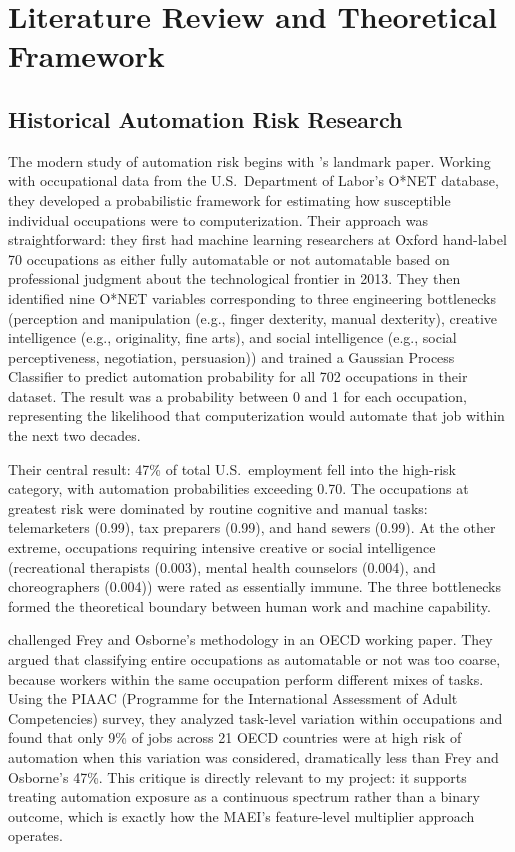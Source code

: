 
\chapter{Literature Review and Theoretical Framework}
\label{chap:literature}

\section{Historical Automation Risk Research}
\label{sec:historical-automation}

The modern study of automation risk begins with \citet{Frey_Osborne_2017}'s landmark paper. Working with occupational data from the U.S.\ Department of Labor's O*NET database, they developed a probabilistic framework for estimating how susceptible individual occupations were to computerization. Their approach was straightforward: they first had machine learning researchers at Oxford hand-label 70 occupations as either fully automatable or not automatable based on professional judgment about the technological frontier in 2013. They then identified nine O*NET variables corresponding to three engineering bottlenecks (perception and manipulation (e.g., finger dexterity, manual dexterity), creative intelligence (e.g., originality, fine arts), and social intelligence (e.g., social perceptiveness, negotiation, persuasion)) and trained a Gaussian Process Classifier to predict automation probability for all 702 occupations in their dataset. The result was a probability between 0 and 1 for each occupation, representing the likelihood that computerization would automate that job within the next two decades.

Their central result: 47\% of total U.S.\ employment fell into the high-risk category, with automation probabilities exceeding 0.70. The occupations at greatest risk were dominated by routine cognitive and manual tasks: telemarketers (0.99), tax preparers (0.99), and hand sewers (0.99). At the other extreme, occupations requiring intensive creative or social intelligence (recreational therapists (0.003), mental health counselors (0.004), and choreographers (0.004)) were rated as essentially immune. The three bottlenecks formed the theoretical boundary between human work and machine capability.

\citet{Arntz_Gregory_Zierahn_2016} challenged Frey and Osborne's methodology in an OECD working paper. They argued that classifying entire occupations as automatable or not was too coarse, because workers within the same occupation perform different mixes of tasks. Using the PIAAC (Programme for the International Assessment of Adult Competencies) survey, they analyzed task-level variation within occupations and found that only 9\% of jobs across 21 OECD countries were at high risk of automation when this variation was considered, dramatically less than Frey and Osborne's 47\%. This critique is directly relevant to my project: it supports treating automation exposure as a continuous spectrum rather than a binary outcome, which is exactly how the MAEI's feature-level multiplier approach operates.

